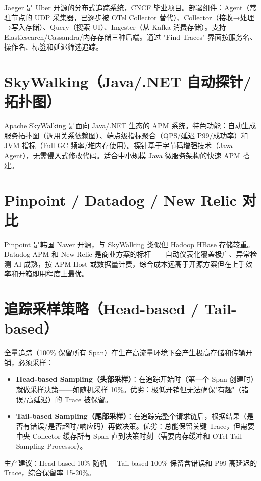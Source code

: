 \documentclass[12pt,UTF8]{ctexbook}
\begin{document}
Jaeger 是 Uber 开源的分布式追踪系统，CNCF 毕业项目。部署组件：Agent（常驻节点的 UDP 采集器，已逐步被 OTel Collector 替代）、Collector（接收→处理→写入存储）、Query（搜索 UI）、Ingester（从 Kafka 消费存储）。支持 Elasticsearch/Cassandra/内存存储三种后端。通过 "Find Traces" 界面按服务名、操作名、标签和延迟筛选追踪。

  \section{SkyWalking（Java/.NET 自动探针/拓扑图）}

Apache SkyWalking 是面向 Java/.NET 生态的 APM 系统。特色功能：自动生成服务拓扑图（调用关系依赖图）、端点级指标聚合（QPS/延迟 P99/成功率）和 JVM 指标（Full GC 频率/堆内存使用）。探针基于字节码增强技术（Java Agent），无需侵入式修改代码。适合中小规模 Java 微服务架构的快速 APM 搭建。

  \section{Pinpoint / Datadog / New Relic 对比}

Pinpoint 是韩国 Naver 开源，与 SkyWalking 类似但 Hadoop HBase 存储较重。Datadog APM 和 New Relic 是商业方案的标杆——自动仪表化覆盖极广、异常检测 AI 成熟，按 APM Host 或数据量计费，综合成本远高于开源方案但在上手效率和开箱即用程度上最优。

  \section{追踪采样策略（Head-based / Tail-based）}

全量追踪（100\% 保留所有 Span）在生产高流量环境下会产生极高存储和传输开销，必须采样：

\begin{itemize}
	\item \textbf{Head-based Sampling（头部采样）}：在追踪开始时（第一个 Span 创建时）就做采样决策——如随机采样 10\%。优劣：极低开销但无法确保"有趣"（错误/高延迟）的 Trace 被保留。
	\item \textbf{Tail-based Sampling（尾部采样）}：在追踪完整个请求链后，根据结果（是否有错误/是否超时/响应码）再做决策。优劣：总能保留关键 Trace，但需要中央 Collector 缓存所有 Span 直到决策时刻（需要内存缓冲和 OTel Tail Sampling Processor）。
\end{itemize}

生产建议：Head-based 10\% 随机 + Tail-based 100\% 保留含错误和 P99 高延迟的 Trace，综合保留率 15-20\%。
\end{document}
